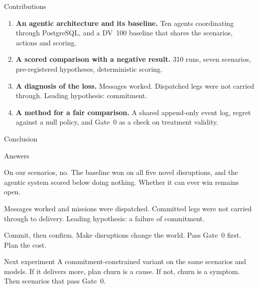 \documentclass[10pt,aspectratio=169]{beamer}
\begin{document}
\begin{frame}{Contributions}
  \begin{enumerate}
    \item \textbf{An agentic architecture and its baseline.} Ten agents
      coordinating through PostgreSQL, and a DV~100 baseline that shares
      the scenarios, actions and scoring.
    \item \textbf{A scored comparison with a negative result.} 310 runs,
      seven scenarios, pre-registered hypotheses, deterministic scoring.
    \item \textbf{A diagnosis of the loss.} Messages worked. Dispatched legs
      were not carried through. Leading hypothesis: commitment.
    \item \textbf{A method for a fair comparison.} A shared append-only
      event log, regret against a null policy, and Gate~0 as a check on
      treatment validity.
  \end{enumerate}
\end{frame}

\begin{frame}{Conclusion}
  \begin{block}{Answers}
    \begin{description}[RQ1]
      \item[RQ1] On our scenarios, no. The baseline won on all five novel
        disruptions, and the agentic system scored below doing nothing.
        Whether it can ever win remains open.
      \item[RQ2] Messages worked and missions were dispatched. Committed legs
        were not carried through to delivery. Leading hypothesis: a failure
        of commitment.
      \item[RQ3] Commit, then confirm. Make disruptions change the world.
        Pass Gate~0 first. Plan the cost.
    \end{description}
  \end{block}
  \begin{exampleblock}{Next experiment}
    A commitment-constrained variant on the same scenarios and models. If it
    delivers more, plan churn is a cause. If not, churn is a symptom. Then
    scenarios that pass Gate~0.
  \end{exampleblock}
\end{frame}
\end{document}
